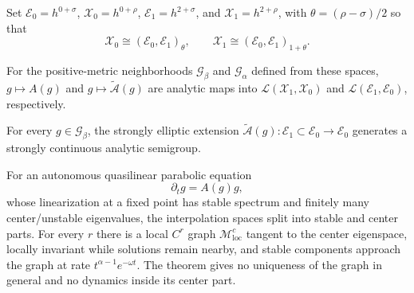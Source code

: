 Set $\mathcal E_0=h^{0+\sigma}$, $\mathcal X_0=h^{0+\rho}$,
$\mathcal E_1=h^{2+\sigma}$, and $\mathcal X_1=h^{2+\rho}$, with
$\theta=(\rho-\sigma)/2$ so that
\begin{equation*}
 \mathcal X_0\cong(\mathcal E_0,\mathcal E_1)_\theta,
 \qquad \mathcal X_1\cong(\mathcal E_0,\mathcal E_1)_{1+\theta}.
 \tag{35.18}
\end{equation*}

\begin{lemma}
\label{lem:chow-iv-deturck-analytic-dependence}
For the positive-metric neighborhoods $\mathcal G_\beta$ and $\mathcal G_\alpha$
defined from these spaces, $g\mapsto A(g)$ and
$g\mapsto\widetilde{\mathcal A}(g)$ are analytic maps into
$\mathcal L(\mathcal X_1,\mathcal X_0)$ and
$\mathcal L(\mathcal E_1,\mathcal E_0)$, respectively.
\end{lemma}

\begin{lemma}
\label{lem:chow-iv-deturck-analytic-semigroup}
For every $g\in\mathcal G_\beta$, the strongly elliptic extension
$\widetilde{\mathcal A}(g):\mathcal E_1\subset\mathcal E_0\to\mathcal E_0$
generates a strongly continuous analytic semigroup.
\end{lemma}

\begin{theorem}
\label{thm:chow-iv-center-manifold}
For an autonomous quasilinear parabolic equation
\begin{equation*}
 \partial_tg=A(g)g,
 \tag{35.19}
\end{equation*}
whose linearization at a fixed point has stable spectrum and finitely many
center/unstable eigenvalues, the interpolation spaces split into stable and
center parts.  For every $r$ there is a local $C^r$ graph
$\mathcal M^c_{\mathrm{loc}}$ tangent to the center eigenspace, locally
invariant while solutions remain nearby, and stable components approach the
graph at rate $t^{\alpha-1}e^{-\omega t}$.  The theorem gives no uniqueness
of the graph in general and no dynamics inside its center part.
\end{theorem}

